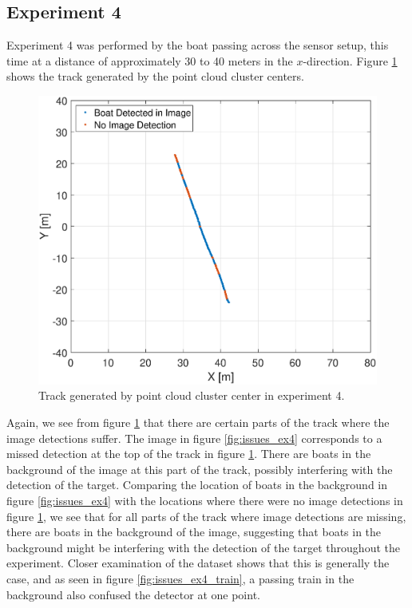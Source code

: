\subsection{Experiment 4}
Experiment 4 was performed by the boat passing across the sensor setup, this time at a distance of approximately 30 to 40 meters in the $x$-direction. Figure \ref{fig:ex4_track} shows the track generated by the point cloud cluster centers.
\begin{figure}[!htb]
	\centering
	\includegraphics[width=.8\linewidth]{fig/exp_4_track.eps}
	\caption{Track generated by point cloud cluster center in experiment 4.}
	\label{fig:ex4_track}
\end{figure}
Again, we see from figure \ref{fig:ex4_track} that there are certain parts of the track where the image detections suffer. The image in figure \ref{fig:issues_ex4} corresponds to a missed detection at the top of the track in figure \ref{fig:ex4_track}. There are boats in the background of the image at this part of the track, possibly interfering with the detection of the target. Comparing the location of boats in the background in figure \ref{fig:issues_ex4} with the locations where there were no image detections in figure \ref{fig:ex4_track}, we see that for all parts of the track where image detections are missing, there are boats in the background of the image, suggesting that boats in the background might be interfering with the detection of the target throughout the experiment. Closer examination of the dataset shows that this is generally the case, and as seen in figure \ref{fig:issues_ex4_train}, a passing train in the background also confused the detector at one point.
